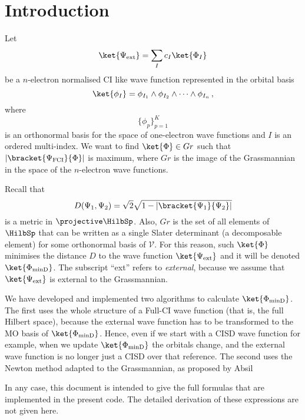 \documentclass[a4paper,11pt]{article}
\begin{document}
\newpage
\section{Introduction}

Let
\begin{equation}\label{eq:ext_wf}
  \ket{\Psi_\text{ext}} = \sum_I c_I \ket{\Phi_I}
\end{equation}
be a $n$-electron normalised CI like wave function represented in the orbital basis
\begin{equation}
  \ket{\phi_I} = \phi_{I_1} \wedge \phi_{I_2} \wedge \dots \wedge \phi_{I_n}\,,
\end{equation}
where
\begin{equation}
  \{\phi_p\}_{p=1}^K
\end{equation}
is an orthonormal basis for the space of one-electron wave functions and $I$ is an ordered multi-index.
We want to find $\ket{\Phi} \in Gr$ such that $|\bracket{\Psi_\text{FCI}}{\Phi}|$ is maximum, where $Gr$ is the image of the Grassmannian in the space of the $n$-electron wave functions.

Recall that
\begin{equation}
  D(\Psi_1, \Psi_2) = \sqrt{2}\sqrt{1 - |\bracket{\Psi_1}{\Psi_2}|}
\end{equation}
is a metric in $\projective \HilbSp$.\cite{}
Also, $Gr$ is the set of all elements of $\HilbSp$ that can be written as a single Slater determinant (a decomposable element) for some orthonormal basis of $\mathcal{V}$.
For this reason, such $\ket{\Phi}$ minimises the distance $D$ to the wave function $\ket{\Psi_\text{ext}}$ and it will be denoted $\ket{\Phi_\text{minD}}$.
The subscript ``ext'' refers to \emph{external}, because we assume that $\ket{\Psi_\text{ext}}$ is external to the Grassmannian.

We have developed and implemented two algorithms to calculate $\ket{\Phi_\text{minD}}$.
The first uses the whole structure of a Full-CI wave function (that is, the full Hilbert space), because the external wave function has to be transformed to the MO basis of $\ket{\Phi_\text{minD}}$.
Hence, even if we start with a CISD wave function for example, when we update $\ket{\Phi_\text{minD}}$ the orbitals change, and the external wave function is no longer just a CISD over that reference.
The second uses the Newton method adapted to the Grassmannian, as proposed by Absil \etal{}\cite{}

In any case, this document is intended to give the full formulas that are implemented in the present code.
The detailed derivation of these expressions are not given here.
\end{document}
